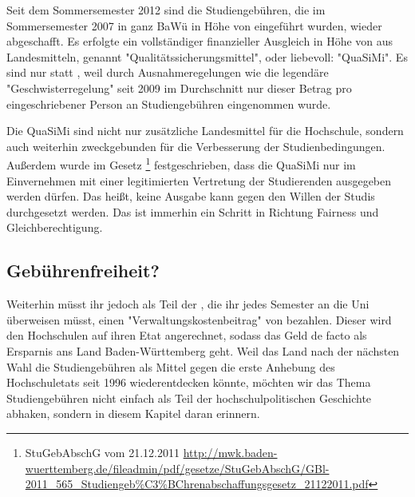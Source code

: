 %

\newpage
{}%
Seit dem Sommersemester 2012 sind die Studiengebühren, die im Sommersemester 2007 in ganz BaWü in Höhe von  eingeführt wurden, wieder abgeschafft. Es erfolgte ein vollständiger finanzieller Ausgleich in Höhe von  aus Landesmitteln, genannt "Qualitätssicherungsmittel", oder liebevoll: "QuaSiMi". Es sind nur  statt , weil durch Ausnahmeregelungen wie die legendäre "Geschwisterregelung" seit 2009 im Durchschnitt nur dieser Betrag pro eingeschriebener Person an Studiengebühren eingenommen wurde.

Die QuaSiMi sind nicht nur zusätzliche Landesmittel für die Hochschule, sondern auch weiterhin zweckgebunden für die Verbesserung der Studienbedingungen. Außerdem wurde im Gesetz \footnote{StuGebAbschG vom 21.12.2011 \url{http://mwk.baden-wuerttemberg.de/fileadmin/pdf/gesetze/StuGebAbschG/GBl-2011_565_Studiengeb\%C3\%BChrenabschaffungsgesetz_21122011.pdf}} festgeschrieben, dass die QuaSiMi nur im Einvernehmen mit einer legitimierten Vertretung der Studierenden ausgegeben werden dürfen. Das heißt, keine Ausgabe kann gegen den Willen der Studis durchgesetzt werden. Das ist immerhin ein Schritt in Richtung Fairness und Gleichberechtigung.

\subsection*{Gebührenfreiheit?}
Weiterhin müsst ihr jedoch als Teil der \EUR{\beitragssumme}, die ihr jedes Semester an die Uni überweisen müsst, einen "Verwaltungskostenbeitrag" von \EUR{\verwaltungsbetrag} bezahlen. Dieser wird den Hochschulen auf ihren Etat angerechnet, sodass das Geld de facto als Ersparnis ans Land Baden-Württemberg geht. Weil das Land nach der nächsten Wahl die Studiengebühren als Mittel gegen die erste Anhebung des Hochschuletats seit 1996 wiederentdecken könnte, möchten wir das Thema Studiengebühren nicht einfach als Teil der hochschulpolitischen Geschichte abhaken, sondern in diesem Kapitel daran erinnern.
\iffalse
Wir laden Euch darüberhinaus ein, Euch über die Hintergründe der Studiengebühren zu informieren, beispielsweise auf unserer Fachschaftshomepage \footnote{http://mathphys.fsk.uni-heidelberg.de/studgeb-historie.html}.
\fi
%

